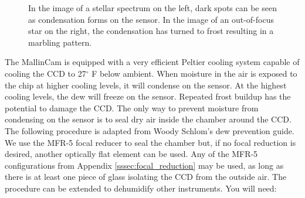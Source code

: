 \documentclass[12pt,titlepage]{article}
\renewcommand\deg{\mbox{$^\circ$}}
\begin{document}
\begin{figure}[H]
	\caption{In the image of a stellar spectrum on the left, dark spots can be seen as condensation forms on the sensor.
				In the image of an out-of-focus star on the right, the condensation has turned to frost resulting in a 
				marbling pattern.}
\end{figure}


The MallinCam is equipped with a very efficient Peltier cooling system capable of cooling the CCD to 27$\deg$ F below ambient.
When moisture in the air is exposed to the chip at higher cooling levels, it will condense on the sensor.
At the highest cooling levels, the dew will freeze on the sensor.
Repeated frost buildup has the potential to damage the CCD.
The only way to prevent moisture from condensing on the sensor is to seal dry air inside the chamber around the CCD.
The following procedure is adapted from Woody Schlom's dew prevention guide.
We use the MFR-5 focal reducer to seal the chamber but, if no focal reduction is desired, another optically flat element can be used.
Any of the MFR-5 configurations from Appendix \ref{sssec:focal_reduction} may be used, as long as there is at least one piece of glass
isolating the CCD from the outside air.
The procedure can be extended to dehumidify other instruments.
You will need:
\end{document}
